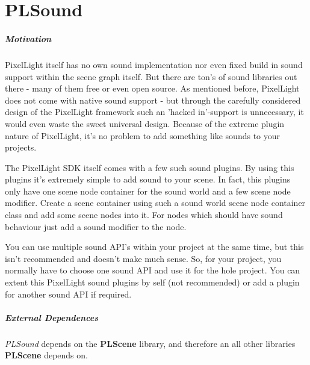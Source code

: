 \chapter{PLSound}


\paragraph{Motivation}
PixelLight itself has no own sound implementation nor even fixed build in sound support within the scene graph itself. But there are ton's of sound libraries out there - many of them free or even open source. As mentioned before, PixelLight does not come with native sound support - but through the carefully considered design of the PixelLight framework such an 'hacked in'-support is unnecessary, it would even waste the sweet universal design. Because of the extreme plugin nature of PixelLight, it's no problem to add something like sounds to your projects.

The PixelLight SDK itself comes with a few such sound plugins. By using this plugins it's extremely simple to add sound to your scene. In fact, this plugins only have one scene node container for the sound world and a few scene node modifier. Create a scene container using such a sound world scene node container class and add some scene nodes into it. For nodes which should have sound behaviour just add a sound modifier to the node.

You can use multiple sound API's within your project at the same time, but this isn't recommended and doesn't make much sense. So, for your project, you normally have to choose one sound API and use it for the hole project. You can extent this PixelLight sound plugins by self (not recommended) or add a plugin for another sound API if required.


\paragraph{External Dependences}
\emph{PLSound} depends on the \textbf{PLScene} library, and therefore an all other libraries \textbf{PLScene} depends on.






\cleardoublepage
